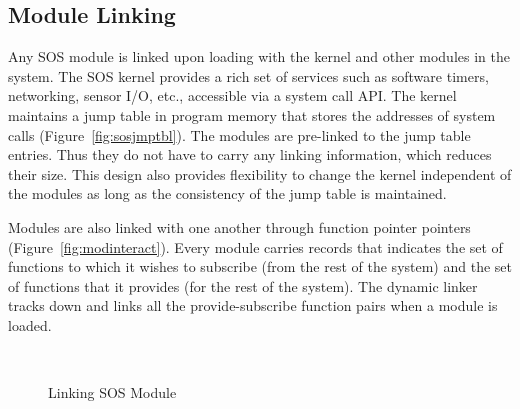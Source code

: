 \subsection{Module Linking}
\label{sec:soslinking}
%
Any SOS module is linked upon loading with the kernel and other
modules in the system. 
%
%
The SOS kernel provides a rich set of services such as software
timers, networking, sensor I/O, etc., accessible via a system
call API.
%
The kernel maintains a jump table in program memory that stores the
addresses of system calls (Figure~\ref{fig:sosjmptbl}).
%
The modules are pre-linked to the jump table entries.
%
Thus they do not have to carry any linking information, which reduces
their size.
%
This design also provides flexibility to change the kernel independent
of the modules as long as the consistency of the jump table is maintained.
%

Modules are also linked with one another through function pointer
pointers (Figure~\ref{fig:modinteract}).
%
Every module carries records that indicates the set of functions to
which it wishes to subscribe (from the rest of the system) and the set
of functions that it provides (for the rest of the system).
%
The dynamic linker tracks down and links all the provide-subscribe
function pairs when a module is loaded.
%
\begin{figure}[htpb]
 \centering
  \mbox{
    \hspace{0.2in}
  }
  \caption{Linking SOS Module}
\end{figure}   
%
